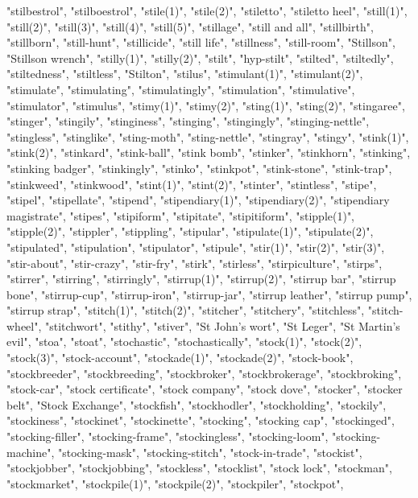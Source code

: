 "stilbestrol",
"stilboestrol",
"stile(1)",
"stile(2)",
"stiletto",
"stiletto heel",
"still(1)",
"still(2)",
"still(3)",
"still(4)",
"still(5)",
"stillage",
"still and all",
"stillbirth",
"stillborn",
"still-hunt",
"stillicide",
"still life",
"stillness",
"still-room",
"Stillson",
"Stillson wrench",
"stilly(1)",
"stilly(2)",
"stilt",
"hyp-stilt",
"stilted",
"stiltedly",
"stiltedness",
"stiltless",
"Stilton",
"stilus",
"stimulant(1)",
"stimulant(2)",
"stimulate",
"stimulating",
"stimulatingly",
"stimulation",
"stimulative",
"stimulator",
"stimulus",
"stimy(1)",
"stimy(2)",
"sting(1)",
"sting(2)",
"stingaree",
"stinger",
"stingily",
"stinginess",
"stinging",
"stingingly",
"stinging-nettle",
"stingless",
"stinglike",
"sting-moth",
"sting-nettle",
"stingray",
"stingy",
"stink(1)",
"stink(2)",
"stinkard",
"stink-ball",
"stink bomb",
"stinker",
"stinkhorn",
"stinking",
"stinking badger",
"stinkingly",
"stinko",
"stinkpot",
"stink-stone",
"stink-trap",
"stinkweed",
"stinkwood",
"stint(1)",
"stint(2)",
"stinter",
"stintless",
"stipe",
"stipel",
"stipellate",
"stipend",
"stipendiary(1)",
"stipendiary(2)",
"stipendiary magistrate",
"stipes",
"stipiform",
"stipitate",
"stipitiform",
"stipple(1)",
"stipple(2)",
"stippler",
"stippling",
"stipular",
"stipulate(1)",
"stipulate(2)",
"stipulated",
"stipulation",
"stipulator",
"stipule",
"stir(1)",
"stir(2)",
"stir(3)",
"stir-about",
"stir-crazy",
"stir-fry",
"stirk",
"stirless",
"stirpiculture",
"stirps",
"stirrer",
"stirring",
"stirringly",
"stirrup(1)",
"stirrup(2)",
"stirrup bar",
"stirrup bone",
"stirrup-cup",
"stirrup-iron",
"stirrup-jar",
"stirrup leather",
"stirrup pump",
"stirrup strap",
"stitch(1)",
"stitch(2)",
"stitcher",
"stitchery",
"stitchless",
"stitch-wheel",
"stitchwort",
"stithy",
"stiver",
"St John's wort",
"St Leger",
"St Martin's evil",
"stoa",
"stoat",
"stochastic",
"stochastically",
"stock(1)",
"stock(2)",
"stock(3)",
"stock-account",
"stockade(1)",
"stockade(2)",
"stock-book",
"stockbreeder",
"stockbreeding",
"stockbroker",
"stockbrokerage",
"stockbroking",
"stock-car",
"stock certificate",
"stock company",
"stock dove",
"stocker",
"stocker belt",
"Stock Exchange",
"stockfish",
"stockhodler",
"stockholding",
"stockily",
"stockiness",
"stockinet",
"stockinette",
"stocking",
"stocking cap",
"stockinged",
"stocking-filler",
"stocking-frame",
"stockingless",
"stocking-loom",
"stocking-machine",
"stocking-mask",
"stocking-stitch",
"stock-in-trade",
"stockist",
"stockjobber",
"stockjobbing",
"stockless",
"stocklist",
"stock lock",
"stockman",
"stockmarket",
"stockpile(1)",
"stockpile(2)",
"stockpiler",
"stockpot",

